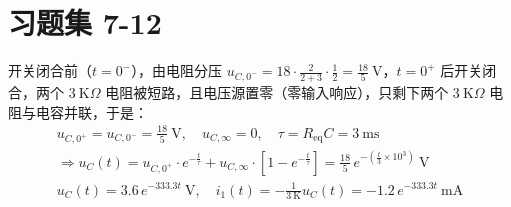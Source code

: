 \documentclass[UTF8]{report}
\def\K{\ \mathrm{K}}
\def\kO{\ \mathrm{K}\Omega}
\theoremstyle{MyLineTheoremStyle} %
\theoremstyle{MyBlockTheoremStyle} %
\theoremstyle{MySubsubsectionStyle} %
\begin{document}
\section{习题集 7-12}
开关闭合前（$t = 0^-$），由电阻分压 $u_{C, 0^-} = 18\cdot \frac{2}{2 + 3}\cdot \frac{1}{2} = \frac{18}{5} \ \mathrm{V}$，$t = 0^+$ 后开关闭合，两个 $3 \kO$ 电阻被短路，且电压源置零（零输入响应），只剩下两个 $3 \kO$ 电阻与电容并联，于是：
\begin{gather}
    u_{C, 0^+} = u_{C, 0^-} = \frac{18}{5} \ \mathrm{V},\quad u_{C, \infty} = 0,\quad \tau = R_{\text{eq}}C = 3 \ \mathrm{ms} \\
    \Longrightarrow 
    u_C(t) = u_{C,0^+}\cdot e^{-\frac{t}{\tau}} + u_{C,\infty}\cdot \left[1 - e^{-\frac{t}{\tau}}\right] = \frac{18}{5} \,e^{-\left(\frac{t}{3}\times 10^3\right)} \ \mathrm{V} \\ 
    \boxed{
        u_C(t) = 3.6 \,e^{-333.3t} \ \mathrm{V},\quad i_1(t) = - \frac{1}{3 \K}u_C(t) = -1.2 \,e^{-333.3t} \ \mathrm{mA}
    }
\end{gather}
\end{document}
